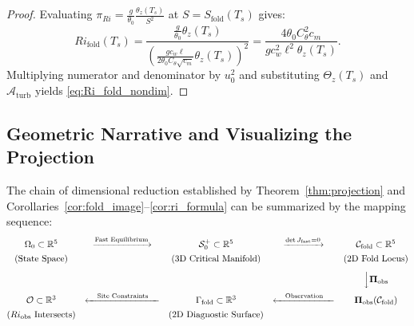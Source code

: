 \begin{proof}
Evaluating $\pi_{Ri} = \frac{g}{\theta_0}\frac{\theta_z(T_s)}{S^2}$ at $S = S_{\mathrm{fold}}(T_s)$ gives:
\begin{equation}
Ri_{\mathrm{fold}}(T_s) = \frac{\frac{g}{\theta_0}\theta_z(T_s)}{\left( \frac{g c_w \ell}{2\theta_0 C_\theta \sqrt{c_m}} \theta_z(T_s) \right)^2} = \frac{4 \theta_0 C_\theta^2 c_m}{g c_w^2 \ell^2 \theta_z(T_s)}.
\end{equation}
Multiplying numerator and denominator by $u_0^2$ and substituting $\Theta_z(T_s)$ and $\mathcal{A}_{\mathrm{turb}}$ yields \eqref{eq:Ri_fold_nondim}.
\end{proof}

\subsection{Geometric Narrative and Visualizing the Projection}

The chain of dimensional reduction established by Theorem~\ref{thm:projection} and Corollaries~\ref{cor:fold_image}--\ref{cor:ri_formula} can be summarized by the mapping sequence:
\begin{equation}
\begin{matrix}
\Omega_0 \subset \mathbb{R}^5 & \xrightarrow{\text{Fast Equilibrium}} & \mathcal{S}_0^+ \subset \mathbb{R}^5 & \xrightarrow{\det J_{\mathrm{fast}} = 0} & \mathcal{C}_{\mathrm{fold}} \subset \mathbb{R}^5 \\[4pt]
\text{(State Space)} & & \text{(3D Critical Manifold)} & & \text{(2D Fold Locus)} \\[8pt]
& & & & \Big\downarrow \boldsymbol{\Pi}_{\mathrm{obs}} \\[8pt]
\mathcal{O} \subset \mathbb{R}^3 & \xleftarrow{\quad \text{Site Constraints} \quad} & \Gamma_{\mathrm{fold}} \subset \mathbb{R}^3 & \xleftarrow{\quad \text{Observation} \quad} & \boldsymbol{\Pi}_{\mathrm{obs}}(\mathcal{C}_{\mathrm{fold}}) \\[4pt]
\text{($Ri_{\mathrm{obs}}$ Intersects)} & & \text{(2D Diagnostic Surface)} & &
\end{matrix}
\end{equation}

